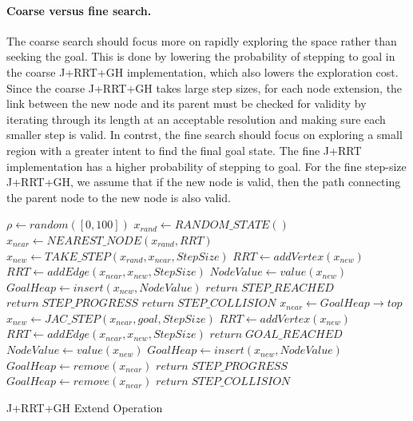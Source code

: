 \documentclass[conference]{IEEEtran}
\begin{document}
\paragraph{Coarse versus fine search.}
The coarse search should focus more on rapidly exploring the space rather
than seeking the goal.  This is done by lowering the probability of stepping
to goal in the coarse J+RRT+GH implementation, which also lowers the
exploration cost.  Since the coarse J+RRT+GH takes large step sizes, for each
node extension, the link between the new node and its parent must be checked 
for validity by iterating through its length at an acceptable resolution and 
making sure each smaller step is valid.  In contrst, the fine search should 
focus on exploring a small region with a greater intent to find the final
goal state.  The fine J+RRT implementation has a higher probability of
stepping to goal.  For the fine step-size J+RRT+GH, we assume that if the new
node is valid, then the path connecting the parent node to the new node is
also valid. 

\begin{algorithm}
  \label{alg:extend}
  \SetAlgoLined

  $\rho \leftarrow random([0,100])$\;
   {
    $x_{rand} \leftarrow RANDOM\_STATE()$\;
    $x_{near} \leftarrow NEAREST\_NODE(x_{rand}, RRT)$\;
    $x_{new} \leftarrow TAKE\_STEP(x_{rand}, x_{near}, StepSize)$\;
	 {
      $RRT \leftarrow addVertex(x_{new})$\;
      $RRT \leftarrow addEdge(x_{near}, x_{new}, StepSize)$\;
      $NodeValue \leftarrow value(x_{new})$\;
      $GoalHeap \leftarrow insert(x_{new}, NodeValue)$\;
	   {
        $return \; STEP\_REACHED$\;
       }{
        $return \; STEP\_PROGRESS$\;
       }
     }{
       $return \; STEP\_COLLISION$\;
     }	
   }{	
    $x_{near} \leftarrow GoalHeap \rightarrow top$\;
    $x_{new} \leftarrow JAC\_STEP(x_{near}, goal, StepSize)$\;
	 {
      $RRT \leftarrow addVertex(x_{new})$\;
      $RRT \leftarrow addEdge(x_{near}, x_{new}, StepSize)$\;
	   {
        $return \; GOAL\_REACHED$\;
       }{
        $NodeValue \leftarrow value(x_{new})$\;
        $GoalHeap \leftarrow insert(x_{new}, NodeValue)$\;
        $GoalHeap \leftarrow remove(x_{near})$\;
        $return \; STEP\_PROGRESS$\;
       }	
     }{
       $GoalHeap \leftarrow remove(x_{near})$\;
       $return \; STEP\_COLLISION$\;
     }
   }
  \caption{J+RRT+GH Extend Operation}
\end{algorithm}
\end{document}
